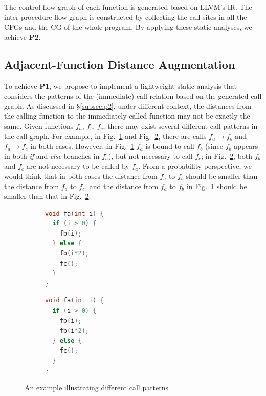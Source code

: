 The control flow graph of each function is generated based on LLVM's IR. The inter-procedure flow graph is constructed by collecting the call sites in all the CFGs and the CG of the whole program.  By applying these static analyses, we achieve \textbf{P2}.




\subsection{Adjacent-Function Distance Augmentation} \label{subsec:functionDist}
To achieve \textbf{P1}, we propose to implement a lightweight static analysis that considers the patterns of the (immediate) call relation based on the generated call graph.
As discussed in \S\ref{subsec:p2}, under different context, the distances from the calling function to the immediately called function may not be exactly the same. 
Given functions $f_a$, $f_b$, $f_c$, there may exist several different call patterns in the call graph. 
For example, in Fig.~\ref{subfig:dist1} and Fig.~\ref{subfig:dist2}, there are calls $f_a\rightarrow f_b$  and  $f_a\rightarrow f_c$ in both cases. 
However, in Fig.~\ref{subfig:dist1}  $f_a$ is bound to call $f_b$ (since $f_b$ appears in both \emph{if} and \emph{else} branches in $f_a$), but not necessary to call $f_c$; in Fig.~\ref{subfig:dist2}, both $f_b$ and $f_c$ are not necessary to be called by $f_a$.
From a probability perspective, we would think that in both cases the distance from $f_a$ to $f_b$ should be smaller than the distance from $f_a$ to $f_c$, and the distance from $f_a$ to $f_b$ in Fig.~\ref{subfig:dist1} should be smaller than that in  Fig.~\ref{subfig:dist2}. 


\begin{figure}[t]
    \centering
\begin{subfigure}[b]{0.4\columnwidth}
\begin{lstlisting}[language=c]
void fa(int i) {
  if (i > 0) {
    fb(i);
  } else {
    fb(i*2);
    fc();
  }
}
\end{lstlisting}  
\caption{}
\label{subfig:dist1}      
\end{subfigure}
\hspace{0.1in}
\centering
\begin{subfigure}[b]{0.4\columnwidth}
\begin{lstlisting}[language=c]        
void fa(int i) {
  if (i > 0) {
    fb(i);
    fb(i*2);
  } else {
    fc();
  }
}        
\end{lstlisting}
\caption{}
\label{subfig:dist2}      
\end{subfigure}
\caption{An example illustrating different call patterns}
\label{figure:dists}
\end{figure}

